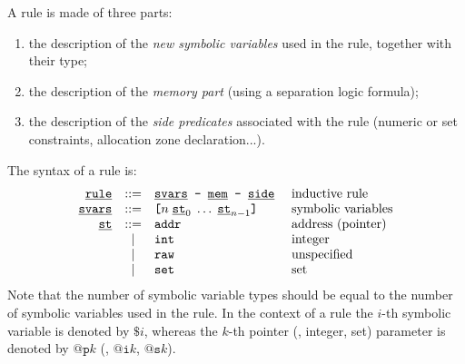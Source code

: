 A rule is made of three parts:
\begin{enumerate}
\item the description of the {\em new symbolic variables} used in the rule,
  together with their type;
\item the description of the {\em memory part} (using a separation logic
  formula);
\item the description of the {\em side predicates} associated with the rule
  (numeric or set constraints, allocation zone declaration...).
\end{enumerate}
The syntax of a rule is:
\[
\begin{array}{rcll}
  \underline{\smash{\texttt{rule}}}
  & ::=
  & \underline{\smash{\texttt{svars}}} \texttt{ - } \underline{\smash{\texttt{mem}}} \texttt{ - } \underline{\smash{\texttt{side}}}
  & \text{ inductive rule}
  \\
  \underline{\smash{\texttt{svars}}}
  & ::=
  & \texttt{[} n \; \underline{\smash{\texttt{st}}}_0 \; \ldots \; \underline{\smash{\texttt{st}}}_{n - 1} \texttt{]}
  & \text{ symbolic variables}
  \\
  \underline{\smash{\texttt{st}}}
  & ::=
  & \texttt{addr}
  & \text{ address (pointer)}
  \\
  & |
  & \texttt{int}
  & \text{ integer}
  \\
  & |
  & \texttt{raw}
  & \text{ unspecified}
  \\
  & |
  & \texttt{set}
  & \text{ set}
  \\
\end{array}
\]
Note that the number of symbolic variable types should be equal to the
number of symbolic variables used in the rule.
In the context of a rule the \( i \)-th symbolic variable is denoted
by \( \texttt{\$}i \), whereas the \( k \)-th pointer (\resp, integer,
set) parameter is denoted by \( \texttt{@p}k \) (\resp, \( \texttt{@i}k \),
\( \texttt{@s}k \)).

